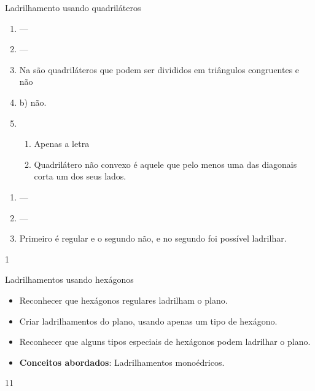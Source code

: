 \begin{answer}{Ladrilhamento usando quadriláteros}
{
	
	\begin{enumerate}
	\item ---
	\item ---
	\item Na  são quadriláteros que podem ser divididos em triângulos congruentes e não \item{b)} não.
	\item 
	\begin{enumerate}
	\item Apenas a letra 
	\item Quadrilátero não convexo é aquele que pelo menos uma das diagonais corta um dos seus lados.
	\end{enumerate}
	\end{enumerate}
	\begin{enumerate}
	\item ---
	\item ---
	\item Primeiro é regular e o segundo não, e no segundo foi possível ladrilhar.
	\end{enumerate}
}{1}
\end{answer}
\clearmargin
\begin{objectives}{Ladrilhamentos usando hexágonos}
{
	\begin{itemize}
	\item Reconhecer que hexágonos regulares ladrilham o plano.
	\item Criar ladrilhamentos do plano, usando apenas um tipo de hexágono.
	\item Reconhecer que alguns tipos especiais de hexágonos podem ladrilhar o plano.
	\item \textbf{Conceitos abordados}: Ladrilhamentos monoédricos.
	\end{itemize}
}{1}{1}
\end{objectives}
